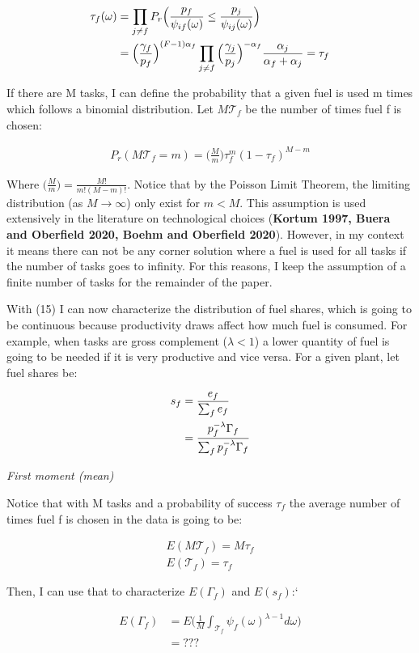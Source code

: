 \documentclass{article}
\begin{document}
\begin{align}
    \tau_f(\omega) &=  \prod_{j \neq f} P_r\Big(\frac{p_f}{\psi_{if}(\omega)} \leq \frac{p_j}{\psi_{ij}(\omega)}\Big) \notag\\ 
    &= \Big( \frac{\gamma_f}{p_f} \Big)^{(F-1)\alpha_f} \prod_{j \neq f} \Big( \frac{\gamma_j}{p_j} \Big)^{-\alpha_f} \frac{\alpha_j}{\alpha_f + \alpha_j} = \tau_f
\end{align}

If there are M tasks, I can define the probability that a given fuel is used m times which follows a binomial distribution. Let $M \mathcal{T}_f$ be the number of times fuel f is chosen:

\begin{align}
    P_r(M \mathcal{T}_f = m) =  \Big( \frac{M}{m} \Big)\tau_f^{m}(1-\tau_f)^{M-m}
\end{align}

Where $\big( \frac{M}{m} \big) = \frac{M!}{m!(M-m)!}$. Notice that by the Poisson Limit Theorem, the limiting distribution (as $M \rightarrow \infty$) only exist for $m < M$. This assumption is used extensively in the literature on technological choices (\textbf{Kortum 1997, Buera and Oberfield 2020, Boehm and Oberfield 2020}). However, in my context it means there can not be any corner solution where a fuel is used for all tasks if the number of tasks goes to infinity. For this reasons, I keep the assumption of a finite number of tasks for the remainder of the paper.

With (15) I can now characterize the distribution of fuel shares, which is going to be continuous because productivity draws affect how much fuel is consumed. For example, when tasks are gross complement ($\lambda < 1$) a lower quantity of fuel is going to be needed if it is very productive and vice versa. For a given plant, let fuel shares be:

\begin{align}
    s_{f} &= \frac{e_{f}}{\sum_f e_{f}} \notag\\
    &= \frac{p_f^{-\lambda} \Gamma_{f}}{\sum_f p_f^{-\lambda} \Gamma_{f}}
\end{align}

\textit{First moment (mean)}

Notice that with M tasks and a probability of success $\tau_f$ the average number of times fuel f is chosen in the data is going to be:

\begin{align*}
    E(M \mathcal{T}_f) = M \tau_f \\
    E(\mathcal{T}_f)  = \tau_f
\end{align*}

Then, I can use that to characterize $E(\Gamma_f)$ and $E(s_f)$:`

\begin{align*}
    E(\Gamma_f) &= E\Big( \frac{1}{M} \int_{\mathcal{T}_f} \psi_f(\omega)^{\lambda-1} d\omega \Big) \\
    &= ???
\end{align*}
\end{document}
